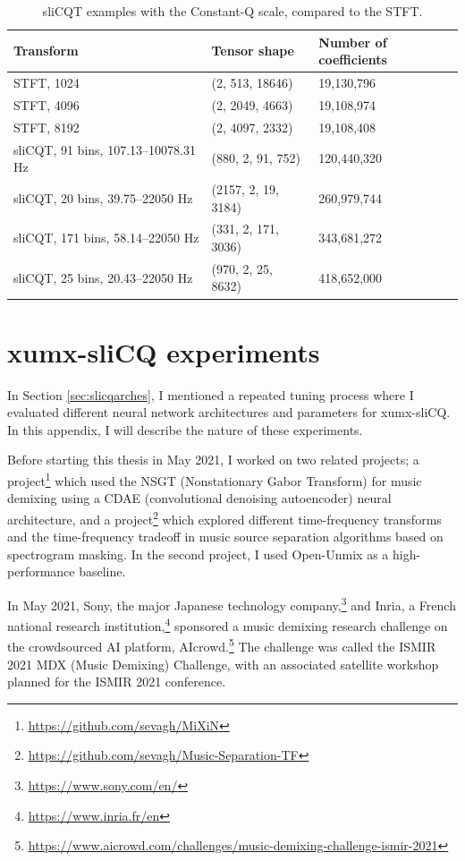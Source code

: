 \documentclass[report.tex]{subfiles}
\begin{document}
\begin{appendices}
\begin{table}[ht]
	\centering
	\caption{sliCQT examples with the Constant-Q scale, compared to the STFT.}
	\label{table:slicqdimstft1}
\begin{tabular}{ |l|l|l| }
	 \hline
	 Transform & Tensor shape & Number of coefficients \\
	 \hline
	 \hline
	 STFT, 1024 & (2, 513, 18646) & 19,130,796  \\
	 \hline
	 STFT, 4096 & (2, 2049, 4663) & 19,108,974  \\
	 \hline
	 STFT, 8192 & (2, 4097, 2332) & 19,108,408  \\
	 \hline
	 \hline
	 sliCQT, 91 bins, 107.13--10078.31 Hz & (880, 2, 91, 752) & 120,440,320 \\
	 \hline
	 sliCQT, 20 bins, 39.75--22050 Hz & (2157, 2, 19, 3184) & 260,979,744 \\
	 \hline
	 sliCQT, 171 bins, 58.14--22050 Hz & (331, 2, 171, 3036) & 343,681,272 \\
	 \hline
	 sliCQT, 25 bins, 20.43--22050 Hz & (970, 2, 25, 8632) & 418,652,000 \\
	 \hline
\end{tabular}
\end{table}

\newpagefill

\section{xumx-sliCQ experiments}
\label{appendix:crazyexperiments}

In Section \ref{sec:slicqarches}, I mentioned a repeated tuning process where I evaluated different neural network architectures and parameters for xumx-sliCQ. In this appendix, I will describe the nature of these experiments.

Before starting this thesis in May 2021, I worked on two related projects; a project\footnote{\url{https://github.com/sevagh/MiXiN}} which used the NSGT (Nonstationary Gabor Transform) for music demixing using a CDAE (convolutional denoising autoencoder) neural architecture, and a project\footnote{\url{https://github.com/sevagh/Music-Separation-TF}} which explored different time-frequency transforms and the time-frequency tradeoff in music source separation algorithms based on spectrogram masking. In the second project, I used Open-Unmix as a high-performance baseline.

In May 2021, Sony, the major Japanese technology company,\footnote{\url{https://www.sony.com/en/}} and Inria, a French national research institution,\footnote{\url{https://www.inria.fr/en}} sponsored a music demixing research challenge on the crowdsourced AI platform, AIcrowd.\footnote{\url{https://www.aicrowd.com/challenges/music-demixing-challenge-ismir-2021}} The challenge was called the ISMIR 2021 MDX (Music Demixing) Challenge, with an associated satellite workshop planned for the ISMIR 2021 conference.


\end{appendices}
\end{document}
